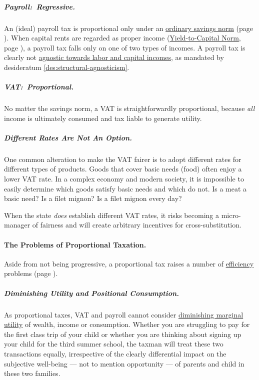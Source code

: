 \subparagraph{Payroll:~Regressive.}
An (ideal) payroll tax is proportional only under an \hyperref[sec:OSN]{ordinary savings norm} (page \pageref{sec:OSN}).
When capital rents are regarded as proper income (\hyperref[sec:Y2C]{Yield-to-Capital Norm}, page \pageref{sec:Y2C}), a payroll tax falls only on one of two types of incomes.
A payroll tax is clearly not \hyperref[des:structural-agnosticism]{agnostic towards labor and capital incomes}, as mandated by desideratum \ref{des:structural-agnosticism}.

\subparagraph{VAT:~Proportional.}
No matter the savings norm, a VAT is straightforwardly proportional, because \emph{all} income is ultimately consumed and tax liable to generate utility.

\subparagraph{Different Rates Are Not An Option.}
One common alteration to make the VAT fairer is to adopt different rates for different types of products.
Goods that cover basic needs (food) often enjoy a lower VAT rate.
In a complex economy and modern society, it is impossible to easily determine which goods satisfy basic needs and which do not.
Is a meat a basic need?
Is a filet mignon?
Is a filet mignon every day?

When the state \emph{does} establish different VAT rates, it risks becoming a micro-manager of fairness and will create arbitrary incentives for cross-substitution.

\paragraph{The Problems of Proportional Taxation.}
Aside from not being progressive, a proportional tax raises a number of \hyperref[sec:tax-optimality]{efficiency} problems (page \pageref{sec:tax-optimality}).

\subparagraph{Diminishing Utility and Positional Consumption.}
As proportional taxes, VAT and payroll cannot consider \hyperref[sec:diminishing-marginal-utility]{diminishing marginal utility} of wealth, income or consumption.
Whether you are struggling to pay for the first class trip of your child or whether you are thinking about signing up your child for the third summer school, the taxman will treat these two transactions equally, irrespective of the clearly differential impact on the subjective well-being --- not to mention opportunity --- of parents and child in these two families.

